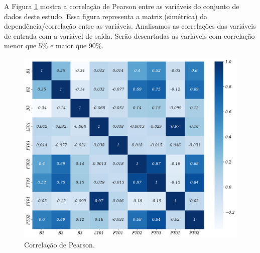 %

A Figura \ref{fig:person} mostra a correlação de Pearson entre as variáveis do conjunto de dados deste estudo. Essa figura representa a matriz (simétrica) da dependência/correlação entre as variáveis. Analisamos as correlações das variáveis de entrada com a variável de saída. Serão descartadas as variáveis com correlação menor que 5\% e maior que 90\%.

\begin{figure}[!htb]
	\centering
	\caption{Correlação de Pearson.}
	\label{fig:person}	\includegraphics[width=0.7\linewidth]{Resultados/Figuras/person}
		
\end{figure}

